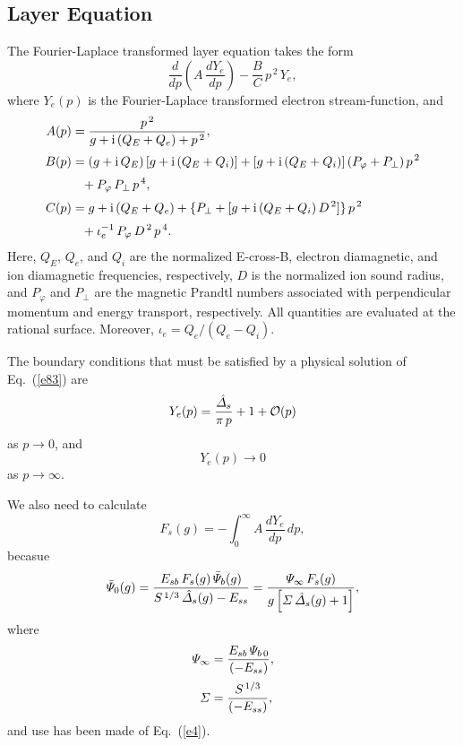 \documentclass[titlepage=false,12pt]{article}
\begin{document}
\subsection{Layer Equation}
The Fourier-Laplace transformed layer equation takes the form 
\begin{equation}\label{e83}
\frac{d}{dp}\!\left(A\,\frac{dY_e}{dp}\right) - \frac{B}{C}\,p^{\,2}\,Y_e,
\end{equation}
where $Y_e(p)$ is the Fourier-Laplace transformed electron stream-function, and
\begin{align}\label{e6}
A(p) &= \frac{p^{\,2}}{g + {\rm i}\,(Q_E+Q_e) + p^{\,2}},\\[0.5ex]
B(p)&=  (g+{\rm i}\,Q_E)\,[g+{\rm i}\,(Q_E+Q_i)] + [g+{\rm i}\,(Q_E+Q_i)]\,(P_\varphi+P_\perp)\,p^{\,2}\nonumber\\[0.5ex]
&\phantom{=}
+ P_\varphi\,P_\perp\,p^{\,4},\\[0.5ex]
C(p)&= g + {\rm i}\,(Q_E+Q_e) +\{P_\perp + [g+{\rm i}\,(Q_E+Q_i)\,D^{\,2}]\}\,p^{\,2} \nonumber\\[0.5ex]
&\phantom{=}+ \iota_e^{-1}\,P_\varphi\,D^{\,2}\,p^{\,4}.
\end{align}
Here, $Q_E$, $Q_e$, and $Q_i$ are the normalized E-cross-B, electron diamagnetic, and ion diamagnetic frequencies,
respectively, $D$ is the normalized ion sound radius, and $P_\varphi$ and $P_\perp$ are the magnetic Prandtl numbers associated with
perpendicular momentum and energy transport, respectively.  All quantities are evaluated at the rational surface. 
Moreover, $\iota_e= Q_e/(Q_e-Q_i)$. 

The boundary conditions that must be satisfied by a physical solution of Eq.~(\ref{e83})  are
\begin{equation}\label{e9}
Y_e(p) = \frac{\hat{\mit\Delta}_s}{\pi\,p}+ 1+{\cal O}(p)
\end{equation}
as $p\rightarrow 0$,
and
\begin{equation}\label{e9a}
Y_e(p)\rightarrow 0
\end{equation}
 as $p\rightarrow\infty$.

We also need to calculate 
\begin{equation}\label{e10}
F_s(g) = -\int_0^\infty A\,\frac{dY_e}{dp}\,dp,
\end{equation}
becasue
\begin{equation}
\bar{\mit\Psi}_0(g) = \frac{E_{sb}\,F_s(g)\,\bar{\mit\Psi}_b(g)}{S^{\,1/3}\,\hat{\mit\Delta}_s(g)-E_{ss}}=\frac{{\mit\Psi}_\infty \,F_s(g)}{g\left[{\mit\Sigma}\,\hat{\mit\Delta}_s(g)+1\right]},
\end{equation}
where
\begin{align}
{\mit\Psi}_\infty& = \frac{E_{sb}\,{\mit\Psi}_{b\,0}}{(-E_{ss})},\\[0.5ex]
{\mit\Sigma}&= \frac{S^{\,1/3}}{(-E_{ss})},
\end{align}
and use has been made of Eq.~(\ref{e4}). 
\end{document}
